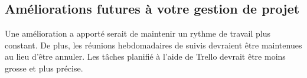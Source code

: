 \subsection{Améliorations futures à votre gestion de projet}

Une amélioration a apporté serait de maintenir un rythme de travail plus constant. De plus, les réunions hebdomadaires de suivis devraient être maintenues au lieu d'être annuler. Les tâches planifié à l'aide de Trello devrait être moins grosse et plus précise.
